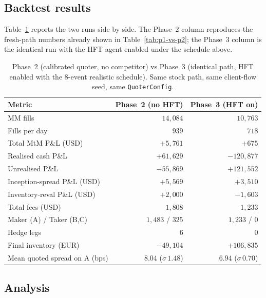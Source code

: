 \subsection{Backtest results}

Table~\ref{tab:p3-vs-p2} reports the two runs side by side. The
Phase~2 column reproduces the fresh-path numbers already shown in
Table~\ref{tab:p1-vs-p2}; the Phase~3 column is the identical run
with the HFT agent enabled under the schedule above.

\begin{table}[ht]
\centering
\begin{tabular}{lrr}
\toprule
Metric & Phase~2 (no HFT) & Phase~3 (HFT on) \\
\midrule
MM fills                          & $14{,}084$    & $10{,}763$ \\
Fills per day                     & $939$         & $718$ \\
Total MtM P\&L (USD)              & $+5{,}761$    & $+675$ \\
\phantom{x}Realised cash P\&L     & $+61{,}629$   & $-120{,}877$ \\
\phantom{x}Unrealised P\&L        & $-55{,}869$   & $+121{,}552$ \\
Inception-spread P\&L (USD)       & $+5{,}569$    & $+3{,}510$ \\
Inventory-reval P\&L (USD)        & $+2{,}000$    & $-1{,}603$ \\
Total fees (USD)                  & $1{,}808$     & $1{,}233$ \\
\phantom{x}Maker (A) / Taker (B,C)& $1{,}483$ / $325$ & $1{,}233$ / $0$ \\
Hedge legs                        & $6$           & $0$ \\
Final inventory (EUR)             & $-49{,}104$   & $+106{,}835$ \\
Mean quoted spread on A (bps)     & $8.04$ ($\sigma\,1.48$) & $6.94$ ($\sigma\,0.70$) \\
\bottomrule
\end{tabular}
\caption{Phase~2 (calibrated quoter, no competitor) vs Phase~3
(identical path, HFT enabled with the 8-event realistic schedule).
Same stock path, same client-flow seed, same \texttt{QuoterConfig}.}
\label{tab:p3-vs-p2}
\end{table}

\subsection{Analysis}

